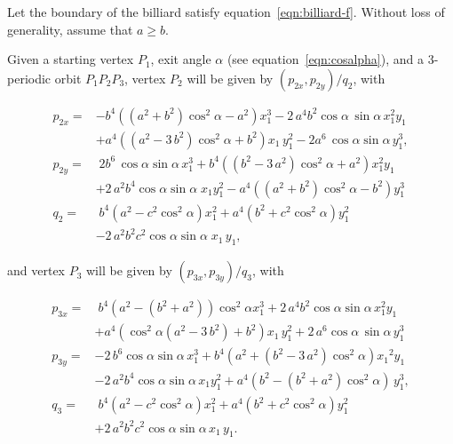 Let the boundary of the billiard satisfy equation~\eqref{eqn:billiard-f}. Without loss of generality, assume that $a {\ge} b$.

Given a starting vertex $P_1$,  exit angle $\alpha$ (see equation~\eqref{eqn:cosalpha}), and a 3-periodic orbit $P_1P_2P_3$, vertex $P_2$ will be given by $(p_{2x},p_{2y})/q_2$, with \cite{garcia2019-ellipses}

\begin{align*}
p_{2x}=&-{b}^{4} \left(  \left(   a^2+{b}^{2}\right)\cos^{2}\alpha   -{a}^{2}  \right) x_1^{3}-2\,{a}^{4}{b}^{2} \cos \alpha  \,\sin  \alpha  \,  x_1^{2}{y_1}\\
&+{a}^{4} \left(  ({a
}^{2}-3\, {b}^{2}) \cos^{2} \alpha  +{b}^{2}
 \right) {x_1}\,y_1^{2}-2{a}^{6} \,\cos  \alpha  \sin   \alpha  \, y_1^{3} ,
\\
p_{2y}=&\; 2{b}^{6} \,\cos \alpha\sin \alpha\,   x_1^{3}+{b}^{4}\left(  ({b
 }^{2}-3\, {a}^{2}) \cos^{2} \alpha  +{a}^{2}
  \right) x_1^{2}{y_1}\\
&+  2\,{a}^{2} {b}^{4}\cos \alpha \sin
  \alpha \; {x_1} y_1^{2} -{
a}^{4}  \left(  \left(   a^2+{b}^{2}\right)\cos^{2}  \alpha  -{b}^{2}  \right)  y_1^{3}
\\
q_2=& \; {b}^{4} \left( a^2-c^2\cos^2\alpha   \right)
x_1^{2}+{a}^{4} \left(  {b}^{2}+c^2\cos^2 \alpha  
 \right) y_1^{2}\\
 & - 2\, {a}^{2}{b}^{2}{c^2}\cos \alpha\sin \alpha \; {x_1}\,{
y_1},
\end{align*}

and vertex $P_3$ will be given by $(p_{3x},p_{3y})/q_3$, with

\begin{align*}
p_{3x}=& \; {b}^{4} \left( {a}^{2}- \left( {b}^{2}+{a}^{2} \right) \right)
 \cos^{2}  \alpha   x_1^{3} +2\,{a}^{4}{b}^{2} \cos  \alpha \sin \alpha\,   x_1^{2}{ y_1}\\
 &+{a}^{4} \left( 
  \cos^{2}  \alpha  \left( {a}^{2}-3\,{b}^{2}
 \right) +{b}^{2} \right) { x_1}\, y_1^{2} +2\, {a}^{6} 
 \cos \alpha\,\sin \alpha\, y_1^{3}
\\
p_{3y}=&  -2\, {b}^{6} \cos \alpha\sin \alpha\, x_1^{3}+{b}^{4} \left( {a}^{2}+ \left( {b}^{2}-3\,{a}^{2} \right)    \cos^2\alpha \right) {{ x_1}}^{2}{ y_1}
\\
& -2\,{a}^{2}  {b}^{4}\cos
 \alpha  \sin \alpha\,  x_1 y_1^{2}+
 {a}^{4} \left( {b}^{2}- \left( {b}^{2}+{a}^{2} \right)   \cos^{2}  \alpha  \right)\,  y_1^{3},
\\
q_3=& \;{b}^{4} \left( {a}^{2}-{c^2}\cos^{2}\alpha   \right) x_1^{2}+{a}^{4} \left( {b}^{2}+c^2\cos^{2}\alpha  \right)  y_1^{2}\\
&+2\,{a}^{2}{b}^{
2} c^2 \cos\alpha \sin\alpha\, { x_1}\,{ y_1}.
\end{align*}

